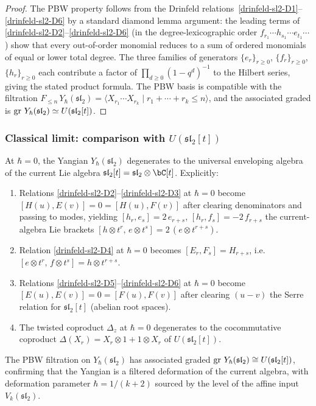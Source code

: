 \begin{proof}
The PBW property follows from the Drinfeld relations~\ref{drinfeld-sl2-D1}--\ref{drinfeld-sl2-D6}
by a standard diamond lemma argument: the leading terms of
\ref{drinfeld-sl2-D2}--\ref{drinfeld-sl2-D6} (in the degree-lexicographic order
$f_{r_1}\cdots h_{s_1}\cdots e_{t_1}\cdots$) show that every
out-of-order monomial reduces to a sum of ordered monomials of
equal or lower total degree. The three families of generators
$\{e_r\}_{r \ge 0}$, $\{f_r\}_{r \ge 0}$, $\{h_r\}_{r \ge 0}$
each contribute a factor of $\prod_{d \ge 0}(1-q^d)^{-1}$ to the
Hilbert series, giving the stated product formula. The PBW
basis is compatible with the filtration
$F_{\le n}\,Y_\hbar(\mathfrak{sl}_2) = \langle X_{r_1}\cdots X_{r_k}
\mid r_1 + \cdots + r_k \le n \rangle$, and the associated graded
is $\operatorname{gr}\,Y_\hbar(\mathfrak{sl}_2) \simeq U(\mathfrak{sl}_2[t])$.
\end{proof}

\subsubsection*{Classical limit: comparison with $U(\mathfrak{sl}_2[t])$}

\begin{theorem}
\ClaimStatusProvedHere
\label{thm:classical-limit-sl2}
At $\hbar = 0$, the Yangian $Y_\hbar(\mathfrak{sl}_2)$ degenerates to the
universal enveloping algebra of the current Lie algebra
$\mathfrak{sl}_2[t] = \mathfrak{sl}_2 \otimes \bC[t]$. Explicitly:
\begin{enumerate}[label=\textup{(\roman*)}]
\item Relations \ref{drinfeld-sl2-D2}--\ref{drinfeld-sl2-D3} at $\hbar = 0$ become
$[H(u), E(v)] = 0 = [H(u), F(v)]$ after clearing denominators
and passing to modes, yielding
$[h_r, e_s] = 2\,e_{r+s}$, $[h_r, f_s] = -2\,f_{r+s}$
the current-algebra Lie brackets
$[h \otimes t^r,\, e \otimes t^s] = 2\,(e \otimes t^{r+s})$.
\item Relation \ref{drinfeld-sl2-D4} at $\hbar = 0$ becomes
$[E_r, F_s] = H_{r+s}$, i.e.\
$[e \otimes t^r,\, f \otimes t^s] = h \otimes t^{r+s}$.
\item Relations \ref{drinfeld-sl2-D5}--\ref{drinfeld-sl2-D6} at $\hbar = 0$ become
$[E(u),E(v)] = 0 = [F(u),F(v)]$ after clearing $(u{-}v)$
the Serre relation for
$\mathfrak{sl}_2[t]$ (abelian root spaces).
\item The twisted coproduct $\Delta_z$ at $\hbar = 0$
degenerates to the cocommutative coproduct
$\Delta(X_r) = X_r \otimes 1 + 1 \otimes X_r$
of $U(\mathfrak{sl}_2[t])$.
\end{enumerate}
The PBW filtration on $Y_\hbar(\mathfrak{sl}_2)$ has associated graded
$\operatorname{gr}\,Y_\hbar(\mathfrak{sl}_2) \cong U(\mathfrak{sl}_2[t])$,
confirming that the Yangian is a filtered deformation of the current
algebra, with deformation parameter $\hbar = 1/(k+2)$ sourced by the
level of the affine input $V_k(\mathfrak{sl}_2)$.
\end{theorem}

